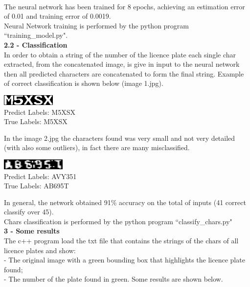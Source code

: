 \documentclass[11pt]{article}
\begin{document}
\begin{titlepage}
{\\ The neural network has been trained for 8 epochs, achieving an estimation error of 0.01 and training error of 0.0019.\\
Neural Network training is performed by the python program ``training\_model.py".
\\[1 mm]
\textbf{\large{2.2 - Classification}}
\\[1 mm]
In order to obtain a string of the number of the licence plate each single char extracted, from the concatenated image, is give in input to the neural network then all predicted characters are concatenated to form the final string. 
Example of correct classification is shown below (image 1.jpg).
\begin{center}
\centering
\includegraphics[totalheight=0.11\textwidth]{plate1.jpg}
\\Predict Labels: M5XSX
\\True Labels: M5XSX 
\end{center}
In the image 2.jpg the characters found was very small and not very detailed (with also some outliers), in fact there are many misclassified.
\begin{center}
\centering
\includegraphics[totalheight=0.11\textwidth]{plate2.jpg}
\\Predict Labels: AVY351 
\\True Labels: AB695T 
\end{center}
In general, the network obtained 91\% accuracy on the total of inputs (41 correct classify over 45).\\
Chars classification is performed by the python program ``classify\_chars.py"
\\[1 mm]
\textbf{\large{3 - Some results}}
\\[1 mm]
The c++ program load the txt file that contains the strings of the chars of all licence plates and show:
\\ - The original image with a green bounding box that highlights the licence plate found;
\\ - The number of the plate found in green. Some results are shown below.
\begin{figure}[htbp]
\centering

\end{figure}}
\end{titlepage}
\end{document}
